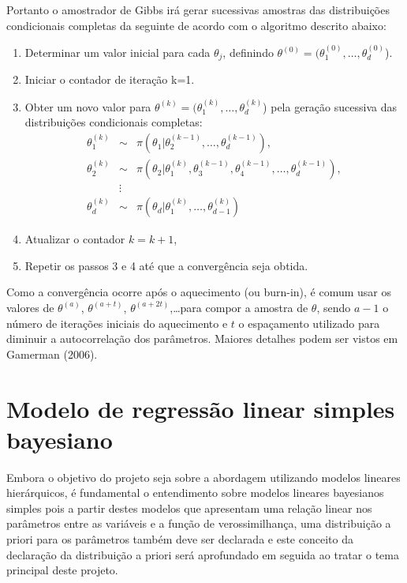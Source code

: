 \documentclass[12pt,a4paper,header]{abnt}
\begin{document}
Portanto o amostrador de Gibbs irá gerar sucessivas amostras das distribuições condicionais completas da seguinte de acordo com o algoritmo descrito abaixo:

\begin{enumerate}
\item Determinar um valor inicial para cada $\theta_j$, definindo $\theta^{(0)}=(\theta^{(0)}_{1},\ldots,\theta^{(0)}_{d}$).
\item Iniciar o contador de iteração k=1.
\item Obter um novo valor para $\theta^{(k)}=(\theta^{(k)}_{1},\ldots,\theta^{(k)}_{d}$) pela geração sucessiva das distribuições condicionais completas:
\begin{eqnarray*}
\theta^{(k)}_{1} &\sim& \pi (\theta_{1} | \theta_{2}^{(k-1)},\ldots,\theta^{(k-1)}_{d} ), \\
\theta^{(k)}_{2} &\sim& \pi (\theta_{2} | \theta_{1}^{(k)},\theta_{3}^{(k-1)},\theta_{4}^{(k-1)},\ldots,\theta^{(k-1)}_{d}), \\
 &\vdots& \\
\theta^{(k)}_{d} &\sim& \pi (\theta_{d} | \theta_{1}^{(k)},\ldots,\theta^{(k)}_{d-1} )
\end{eqnarray*}
\item Atualizar o contador $k=k+1$,
\item Repetir os passos 3 e 4 até que a convergência seja obtida.
\end{enumerate}

Como a convergência ocorre após o aquecimento (ou burn-in), é comum usar os valores de $\theta^{(a)}$, $\theta^{(a+t)}$, $ \theta^{(a+2t)}$,\ldots para compor a amostra de $\theta$, sendo $a-1$ o número de iterações iniciais do aquecimento e $t$ o espaçamento utilizado para diminuir a autocorrelação dos parâmetros. Maiores detalhes podem ser vistos em Gamerman (2006)\cite{Gamerman06}.

\section{Modelo de regressão linear simples bayesiano}\label{cap:MRLS}

Embora o objetivo do projeto seja sobre a abordagem utilizando modelos lineares hierárquicos, é fundamental o entendimento sobre modelos lineares bayesianos simples pois a partir destes modelos que apresentam uma relação linear nos parâmetros entre as variáveis e a função de verossimilhança, uma distribuição a priori para os parâmetros também deve ser declarada e este conceito da declaração da distribuição a priori será aprofundado em seguida ao tratar o tema principal deste projeto.
\end{document}
